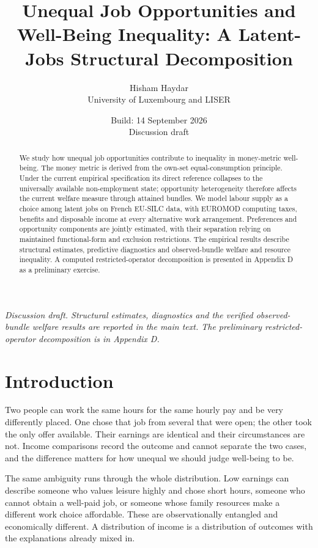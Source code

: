 \documentclass[11pt,a4paper]{article}
\title{Unequal Job Opportunities and Well-Being Inequality: A Latent-Jobs Structural Decomposition}
\author{Hisham Haydar\\University of Luxembourg and LISER}
\date{Build: 14 September 2026\\Discussion draft}
\begin{document}
\maketitle
\begin{abstract}
We study how unequal job opportunities contribute to inequality in money-metric well-being. The money metric is derived from the own-set equal-consumption principle. Under the current empirical specification its direct reference collapses to the universally available non-employment state; opportunity heterogeneity therefore affects the current welfare measure through attained bundles. We model labour supply as a choice among latent jobs on French EU-SILC data, with EUROMOD computing taxes, benefits and disposable income at every alternative work arrangement. Preferences and opportunity components are jointly estimated, with their separation relying on maintained functional-form and exclusion restrictions. The empirical results describe structural estimates, predictive diagnostics and observed-bundle welfare and resource inequality. A computed restricted-operator decomposition is presented in Appendix D as a preliminary exercise.
\end{abstract}

\emph{Discussion draft. Structural estimates, diagnostics and the verified observed-bundle welfare results are reported in the main text. The preliminary restricted-operator decomposition is in Appendix D.}

\section{Introduction}\label{introduction}

Two people can work the same hours for the same hourly pay and be very differently placed. One chose that job from several that were open; the other took the only offer available. Their earnings are identical and their circumstances are not. Income comparisons record the outcome and cannot separate the two cases, and the difference matters for how unequal we should judge well-being to be.

The same ambiguity runs through the whole distribution. Low earnings can describe someone who values leisure highly and chose short hours, someone who cannot obtain a well-paid job, or someone whose family resources make a different work choice affordable. These are observationally entangled and economically different. A distribution of income is a distribution of outcomes with the explanations already mixed in.
\end{document}
